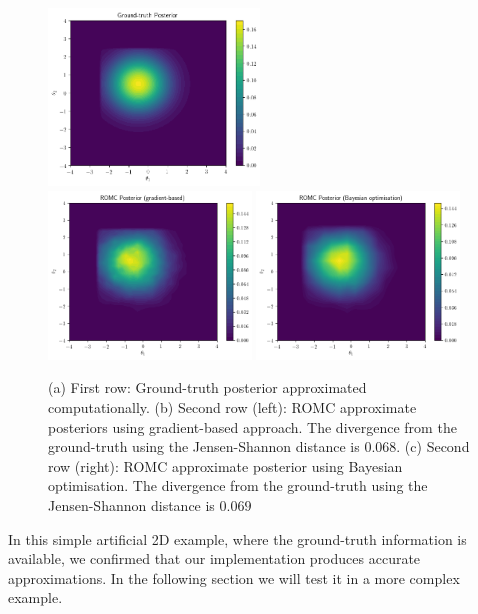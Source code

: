 \begin{figure}[h]
  \begin{center}
      \includegraphics[width=0.5\textwidth]{./Thesis/images/chapter4/ex2D_gt_posterior.png}\\
      \includegraphics[width=0.48\textwidth]{./Thesis/images/chapter4/ex2D_romc_posterior.png}
      \includegraphics[width=0.48\textwidth]{./Thesis/images/chapter4/ex2D_romc_posterior_bo.png}
    \end{center}
    \caption{(a) First row: Ground-truth posterior approximated
      computationally. (b) Second row (left): ROMC approximate
      posteriors using gradient-based approach. The divergence from
      the ground-truth using the Jensen-Shannon distance is
      $0.068$. (c) Second row (right): ROMC approximate posterior
      using Bayesian optimisation. The divergence from the
      ground-truth using the Jensen-Shannon distance is $0.069$}
  \label{fig:ex2_4}
\end{figure}

In this simple artificial 2D example, where the ground-truth
information is available, we confirmed that our implementation
produces accurate approximations. In the following section we will
test it in a more complex example.
